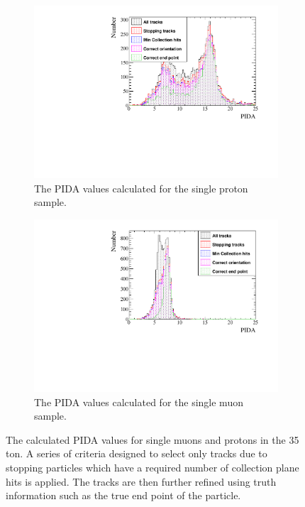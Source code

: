 \begin{figure}[h!]
  \centering
  \begin{subfigure}{.45\textwidth}
        \centering
        \includegraphics[width=\textwidth]{IsolatedProtons_500V_Dec16_Proton_PIDA}
        \caption{The PIDA values calculated for the single proton sample.}
        \label{fig:Isol_PIDA_Proton}
  \end{subfigure}
  \hspace{0.08\textwidth}
  \begin{subfigure}{.45\textwidth}
        \centering
        \includegraphics[width=\textwidth]{IsolatedMuons_500V_Dec16_Muon_PIDA}
        \caption{The PIDA values calculated for the single muon sample.}
        \label{fig:Isol_PIDA_Muon}
  \end{subfigure}
  \caption[The calculated PIDA values for single muons and protons in the 35 ton.]
          {The calculated PIDA values for single muons and protons in the 35 ton. A series of criteria designed to select only tracks due to stopping particles which have a required number of collection plane hits is applied. The tracks are then further refined using truth information such as the true end point of the particle.}
  \label{fig:Isol_PIDA}
\end{figure}

